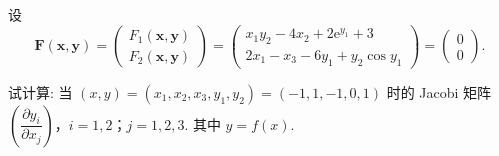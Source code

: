 \begin{example}\label{ex:8.4.10}
设
\[
  \boldsymbol{F}(\boldsymbol{x},\boldsymbol{y}) = \begin{pmatrix} F_{1}(\boldsymbol{x},\boldsymbol{y}) \\ F_{2}(\boldsymbol{x},\boldsymbol{y}) \end{pmatrix} = \begin{pmatrix} x_{1}y_{2} - 4x_{2} + 2\mathrm{e}^{y_{1}} + 3 \\ 2x_{1} - x_{3} - 6y_{1} + y_{2}\cos y_{1} \end{pmatrix} = \begin{pmatrix} 0 \\ 0 \end{pmatrix}.
\]

试计算: 当 $(x,y) = (x_{1},x_{2},x_{3},y_{1},y_{2}) = (-1,1,-1,0,1)$ 时的 Jacobi 矩阵 $\left(\dfrac{\partial y_{i}}{\partial x_{j}}\right)$，$i = 1,2$；$j = 1,2,3$. 其中 $y = f(x)$.
\end{example}

